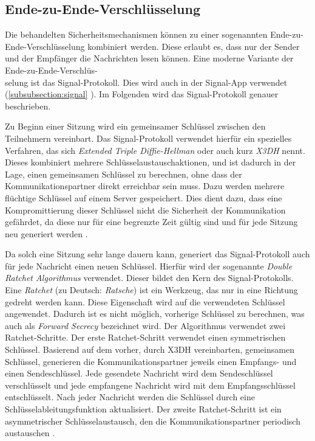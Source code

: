 \subsection{Ende-zu-Ende-Verschlüsselung}
\label{subsec:signal_protokoll_basics}


Die behandelten Sicherheitsmechanismen können zu einer sogenannten Ende-zu-Ende-Verschlüsselung kombiniert werden. Diese erlaubt es, dass nur der Sender und der Empfänger die Nachrichten lesen können. Eine moderne Variante der Ende-zu-Ende-Verschlüs-\\selung ist das Signal-Protokoll. Dies wird auch in der Signal-App verwendet (\ref{subsubsection:signal} \textit{}). Im Folgenden wird das Signal-Protokoll genauer beschrieben.

Zu Beginn einer Sitzung wird ein gemeinsamer Schlüssel zwischen den Teilnehmern vereinbart. Das Signal-Protokoll verwendet hierfür ein spezielles Verfahren, das sich \textit{Extended Triple Diffie-Hellman} oder auch kurz \textit{X3DH} nennt. Dieses kombiniert mehrere Schlüsselaustauschaktionen, und ist dadurch in der Lage, einen gemeinsamen Schlüssel zu berechnen, ohne dass der Kommunikationspartner direkt erreichbar sein muss. Dazu werden mehrere flüchtige Schlüssel auf einem Server gespeichert. Dies dient dazu, dass eine Kompromittierung dieser Schlüssel nicht die Sicherheit der Kommunikation gefährdet, da diese nur für eine begrenzte Zeit gültig sind und für jede Sitzung neu generiert werden \Parencite[S. 249-252]{Wong_KryptoPraxis}.


Da solch eine Sitzung sehr lange dauern kann, generiert das Signal-Protokoll auch für jede Nachricht einen neuen Schlüssel. Hierfür wird der sogenannte \textit{Double Ratchet Algorithmus} verwendet. Dieser bildet den Kern des Signal-Protokolls. Eine \textit{Ratchet} (zu Deutsch: \textit{Ratsche}) ist ein Werkzeug, das nur in eine Richtung gedreht werden kann. Diese Eigenschaft wird auf die verwendeten Schlüssel angewendet. Dadurch ist es nicht möglich, vorherige Schlüssel zu berechnen, was auch als \textit{Forward Secrecy} bezeichnet wird. Der Algorithmus verwendet zwei Ratchet-Schritte. Der erste Ratchet-Schritt verwendet einen symmetrischen Schlüssel. Basierend auf dem vorher, durch X3DH vereinbarten, gemeinsamen Schlüssel, generieren die Kommunikationspartner jeweils einen Empfangs- und einen Sendeschlüssel. Jede gesendete Nachricht wird dem Sendeschlüssel verschlüsselt und jede empfangene Nachricht wird mit dem Empfangsschlüssel entschlüsselt. Nach jeder Nachricht werden die Schlüssel durch eine Schlüsselableitungsfunktion aktualisiert. Der zweite Ratchet-Schritt ist ein asymmetrischer Schlüsselaustausch, den die Kommunikationspartner periodisch austauschen \Parencite[S. 252-257]{Wong_KryptoPraxis}. 

